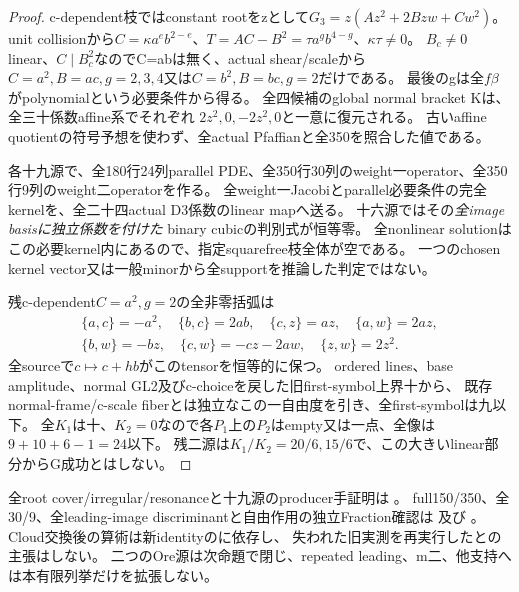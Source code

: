 \documentclass[a4paper,11pt]{ltjsarticle}
\theoremstyle{definition}
\begin{document}
\begin{proof}
c-dependent枝ではconstant rootをzとして$G_3=z(Az^2+2Bzw+Cw^2)$。
unit collisionから$C=\kappa a^eb^{2-e}$、$T=AC-B^2=\tau a^gb^{4-g}$、$\kappa\tau\ne0$。
$B_c\ne0$ linear、$C\mid B_c^2$なのでC=abは無く、actual shear/scaleから
$C=a^2,B=ac,g=2,3,4$又は$C=b^2,B=bc,g=2$だけである。
最後のgは全$f\beta$がpolynomialという必要条件から得る。
全四候補のglobal normal bracket Kは、全三十係数affine系でそれぞれ
$2z^2,0,-2z^2,0$と一意に復元される。
古いaffine quotientの符号予想を使わず、全actual Pfaffianと全350を照合した値である。

各十九源で、全180行24列parallel PDE、全350行30列のweight一operator、全350行9列のweight二operatorを作る。
全weight一Jacobiとparallel必要条件の完全kernelを、全二十四actual D3係数のlinear mapへ送る。
十六源ではその\emph{全image basisに独立係数を付けた} binary cubicの判別式が恒等零。
全nonlinear solutionはこの必要kernel内にあるので、指定squarefree枝全体が空である。
一つのchosen kernel vector又は一般minorから全supportを推論した判定ではない。

残c-dependent$C=a^2,g=2$の全非零括弧は
\[
\begin{gathered}
 \{a,c\}=-a^2,\quad\{b,c\}=2ab,\quad\{c,z\}=az,\quad
 \{a,w\}=2az,\\
 \{b,w\}=-bz,\quad
 \{c,w\}=-cz-2aw,\quad\{z,w\}=2z^2.
\end{gathered}
\]
全sourceで$c\mapsto c+hb$がこのtensorを恒等的に保つ。
ordered lines、base amplitude、normal GL2及びc-choiceを戻した旧first-symbol上界十から、
既存normal-frame/c-scale fiberとは独立なこの一自由度を引き、全first-symbolは九以下。
全$K_1$は十、$K_2=0$なので各$P_1$上の$P_2$はempty又は一点、全像は$9+10+6-1=24$以下。
残二源は$K_1/K_2=20/6,15/6$で、この大きいlinear部分からG成功とはしない。
\end{proof}
全root cover/irregular/resonanceと十九源のproducer手証明は
。
full150/350、全30/9、全leading-image discriminantと自由作用の独立Fraction確認は
及び
。
Cloud交換後の算術は新identityのに依存し、
失われた旧実測を再実行したとの主張はしない。
二つのOre源は次命題で閉じ、repeated leading、m二、他支持へは本有限列挙だけを拡張しない。
\end{document}
